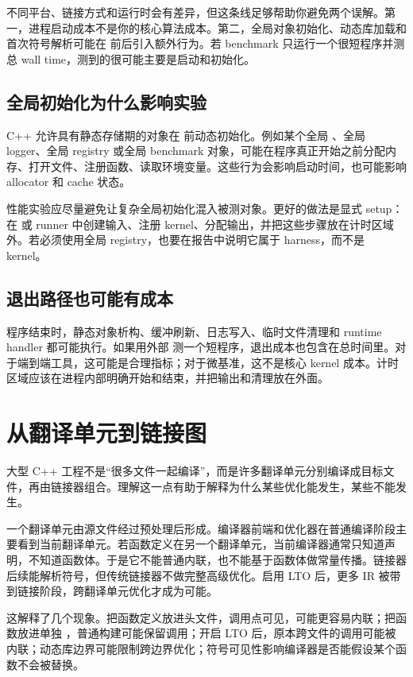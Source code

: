 不同平台、链接方式和运行时会有差异，但这条线足够帮助你避免两个误解。第一，进程启动成本不是你的核心算法成本。第二，全局对象初始化、动态库加载和首次符号解析可能在  前后引入额外行为。若 benchmark 只运行一个很短程序并测总 wall time，测到的很可能主要是启动和初始化。

\subsection{全局初始化为什么影响实验}

C++ 允许具有静态存储期的对象在  前动态初始化。例如某个全局 、全局 logger、全局 registry 或全局 benchmark 对象，可能在程序真正开始之前分配内存、打开文件、注册函数、读取环境变量。这些行为会影响启动时间，也可能影响 allocator 和 cache 状态。

性能实验应尽量避免让复杂全局初始化混入被测对象。更好的做法是显式 setup：在  或 runner 中创建输入、注册 kernel、分配输出，并把这些步骤放在计时区域外。若必须使用全局 registry，也要在报告中说明它属于 harness，而不是 kernel。

\subsection{退出路径也可能有成本}

程序结束时，静态对象析构、缓冲刷新、日志写入、临时文件清理和 runtime handler 都可能执行。如果用外部  测一个短程序，退出成本也包含在总时间里。对于端到端工具，这可能是合理指标；对于微基准，这不是核心 kernel 成本。计时区域应该在进程内部明确开始和结束，并把输出和清理放在外面。

\section{从翻译单元到链接图}

大型 C++ 工程不是“很多文件一起编译”，而是许多翻译单元分别编译成目标文件，再由链接器组合。理解这一点有助于解释为什么某些优化能发生，某些不能发生。

一个翻译单元由源文件经过预处理后形成。编译器前端和优化器在普通编译阶段主要看到当前翻译单元。若函数定义在另一个翻译单元，当前编译器通常只知道声明，不知道函数体。于是它不能普通内联，也不能基于函数体做常量传播。链接器后续能解析符号，但传统链接器不做完整高级优化。启用 LTO 后，更多 IR 被带到链接阶段，跨翻译单元优化才成为可能。

这解释了几个现象。把函数定义放进头文件，调用点可见，可能更容易内联；把函数放进单独 ，普通构建可能保留调用；开启 LTO 后，原本跨文件的调用可能被内联；动态库边界可能限制跨边界优化；符号可见性影响编译器是否能假设某个函数不会被替换。

